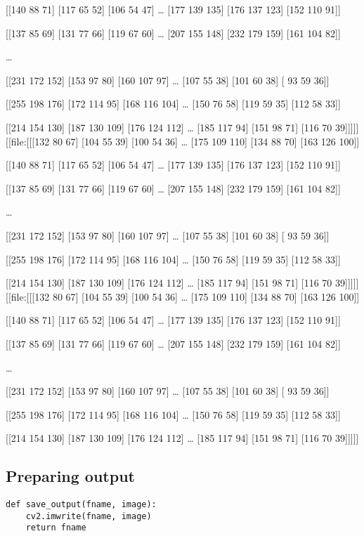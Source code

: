 \documentclass[letterpaper, 11pt]{article}
\begin{document}
[[140  88  71]
 [117  65  52]
 [106  54  47]
 \ldots{}
 [177 139 135]
 [176 137 123]
 [152 110  91]]

[[137  85  69]
 [131  77  66]
 [119  67  60]
 \ldots{}
 [207 155 148]
 [232 179 159]
 [161 104  82]]

\ldots{}

[[231 172 152]
 [153  97  80]
 [160 107  97]
 \ldots{}
 [107  55  38]
 [101  60  38]
 [ 93  59  36]]

[[255 198 176]
 [172 114  95]
 [168 116 104]
 \ldots{}
 [150  76  58]
 [119  59  35]
 [112  58  33]]

 [[214 154 130]
  [187 130 109]
  [176 124 112]
  \ldots{}
  [185 117  94]
  [151  98  71]
  [116  70  39]]]]]
[[file:[[[132  80  67]
  [104  55  39]
  [100  54  36]
  \ldots{}
  [175 109 110]
  [134  88  70]
  [163 126 100]]

[[140  88  71]
 [117  65  52]
 [106  54  47]
 \ldots{}
 [177 139 135]
 [176 137 123]
 [152 110  91]]

[[137  85  69]
 [131  77  66]
 [119  67  60]
 \ldots{}
 [207 155 148]
 [232 179 159]
 [161 104  82]]

\ldots{}

[[231 172 152]
 [153  97  80]
 [160 107  97]
 \ldots{}
 [107  55  38]
 [101  60  38]
 [ 93  59  36]]

[[255 198 176]
 [172 114  95]
 [168 116 104]
 \ldots{}
 [150  76  58]
 [119  59  35]
 [112  58  33]]

 [[214 154 130]
  [187 130 109]
  [176 124 112]
  \ldots{}
  [185 117  94]
  [151  98  71]
  [116  70  39]]]]]
[[file:[[[132  80  67]
  [104  55  39]
  [100  54  36]
  \ldots{}
  [175 109 110]
  [134  88  70]
  [163 126 100]]

[[140  88  71]
 [117  65  52]
 [106  54  47]
 \ldots{}
 [177 139 135]
 [176 137 123]
 [152 110  91]]

[[137  85  69]
 [131  77  66]
 [119  67  60]
 \ldots{}
 [207 155 148]
 [232 179 159]
 [161 104  82]]

\ldots{}

[[231 172 152]
 [153  97  80]
 [160 107  97]
 \ldots{}
 [107  55  38]
 [101  60  38]
 [ 93  59  36]]

[[255 198 176]
 [172 114  95]
 [168 116 104]
 \ldots{}
 [150  76  58]
 [119  59  35]
 [112  58  33]]

[[214 154 130]
 [187 130 109]
 [176 124 112]
 \ldots{}
 [185 117  94]
 [151  98  71]
 [116  70  39]]]]]
\subsection{Preparing output}
\label{sec:org5dd47b5}
\begin{verbatim}
def save_output(fname, image):
    cv2.imwrite(fname, image)
    return fname
\end{verbatim}
\end{document}

